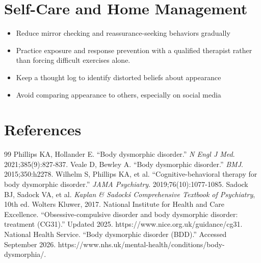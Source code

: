 \section*{Self-Care and Home Management}
\begin{itemize}
 \item Reduce mirror checking and reassurance-seeking behaviors gradually
 \item Practice exposure and response prevention with a qualified therapist rather than forcing difficult exercises alone.
 \item Keep a thought log to identify distorted beliefs about appearance
 \item Avoid comparing appearance to others, especially on social media
\end{itemize}

\section*{References}
\begin{thebibliography}{99}
 Phillips KA, Hollander E. ``Body dysmorphic disorder.'' \textit{N Engl J Med}. 2021;385(9):827-837.
 Veale D, Bewley A. ``Body dysmorphic disorder.'' \textit{BMJ}. 2015;350:h2278.
 Wilhelm S, Phillips KA, et al. ``Cognitive-behavioral therapy for body dysmorphic disorder.'' \textit{JAMA Psychiatry}. 2019;76(10):1077-1085.
 Sadock BJ, Sadock VA, et al. \textit{Kaplan \& Sadock\'s Comprehensive Textbook of Psychiatry}, 10th ed. Wolters Kluwer, 2017.
 National Institute for Health and Care Excellence. ``Obsessive-compulsive disorder and body dysmorphic disorder: treatment (CG31).'' Updated 2025. https://www.nice.org.uk/guidance/cg31.
 National Health Service. ``Body dysmorphic disorder (BDD).'' Accessed September 2026. https://www.nhs.uk/mental-health/conditions/body-dysmorphia/.
\end{thebibliography}
